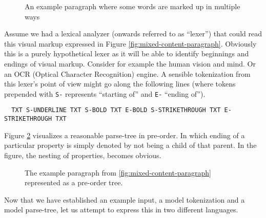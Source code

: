 \documentclass{scrreprt}
\begin{document}
\begin{figure}[h]
\centering
{}
\caption{An example paragraph where some words are marked up in multiple ways}
\label{fig:mixed-content-nesting}
\end{figure}






Assume we had a lexical analyzer (onwards referred to as ``lexer'') that could read this visual markup expressed in Figure \ref{fig:mixed-content-paragraph}. Obviously this is a purely hypothetical lexer as it will be able to identify beginnings and endings of visual markup. Consider for example the human vision and mind. Or an OCR (Optical Character Recognition) engine. A sensible tokenization from this lexer's point of view might go along the following lines (where tokens prepended with \texttt{S-} represents ``starting of'' and \texttt{E-} ``ending of'').




\begin{lstlisting}
  TXT S-UNDERLINE TXT S-BOLD TXT E-BOLD S-STRIKETHROUGH TXT E-STRIKETHROUGH TXT
\end{lstlisting}



Figure \ref{fig:mixed-content-tree} visualizes a reasonable parse-tree in pre-order. In which ending of a particular property is simply denoted by not being a child of that parent. In the figure, the nesting of properties, becomes obvious.
  



\begin{figure}[h]
  \centering

  \caption{The example paragraph from \ref{fig:mixed-content-paragraph} represented as a pre-order tree.}
  \label{fig:mixed-content-tree}
\end{figure}



Now that we have established an example input, a model tokenization and a model parse-tree, let us attempt to express this in two different languages.
\end{document}
